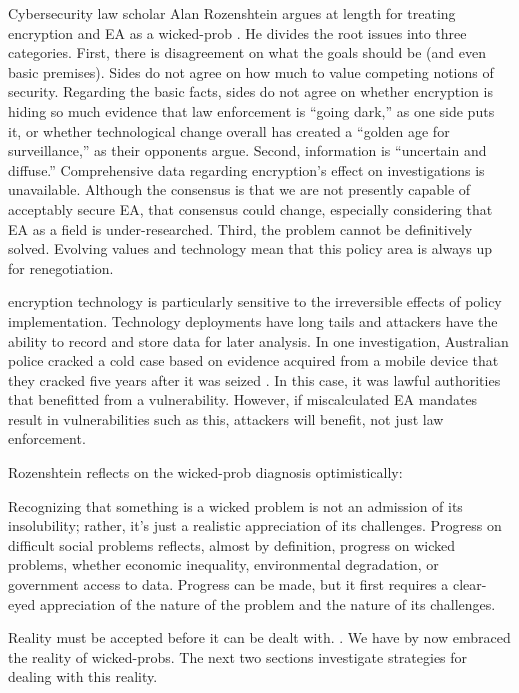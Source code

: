 Cybersecurity law scholar Alan Rozenshtein argues at length for treating \ac{encryption} and \ac{EA} as a
\ac{wicked-prob} \cite{rozenshtein_wicked_2018}. He divides the root issues into three categories. First, there is
disagreement on what the goals should be (and even basic premises). Sides do not agree on how much to value competing
notions of security. Regarding the basic facts, sides do not agree on whether encryption is hiding so much evidence that
law enforcement is ``going dark,'' as one side puts it, or whether technological change overall has created a ``golden
age for surveillance,'' as their opponents argue. Second, information is ``uncertain and diffuse.'' Comprehensive data
regarding encryption's effect on investigations is unavailable. Although the consensus is that we are not presently
capable of acceptably secure \ac{EA}, that consensus could change, especially considering that \ac{EA} as a field is
under-researched. Third, the problem cannot be definitively solved. Evolving values and technology mean that this policy
area is always up for renegotiation.

\Ac{encryption} technology is particularly sensitive to the irreversible effects of policy implementation. Technology
deployments have long tails and attackers have the ability to record and store data for later analysis. In one
investigation, Australian police cracked a cold case based on evidence acquired from a mobile device that they cracked
five years after it was seized \cite{evans_arrests_2020}. In this case, it was lawful authorities that benefitted from a
vulnerability. However, if miscalculated \ac{EA} mandates result in vulnerabilities such as this, attackers will
benefit, not just law enforcement.

Rozenshtein reflects on the \ac{wicked-prob} diagnosis optimistically:

\begin{displayquote}
Recognizing that something is a wicked problem is not an admission of its insolubility; rather, it’s just a realistic
appreciation of its challenges. Progress on difficult social problems reflects, almost by definition, progress on wicked
problems, whether economic inequality, environmental degradation, or government access to data. Progress can be made,
but it first requires a clear-eyed appreciation of the nature of the problem and the nature of its challenges.
\cite{rozenshtein_wicked_2018}
\end{displayquote}

Reality must be accepted before it can be dealt with. \cite{baker_2019}. We have by now embraced the reality of
\acp{wicked-prob}. The next two sections investigate strategies for dealing with this reality.


